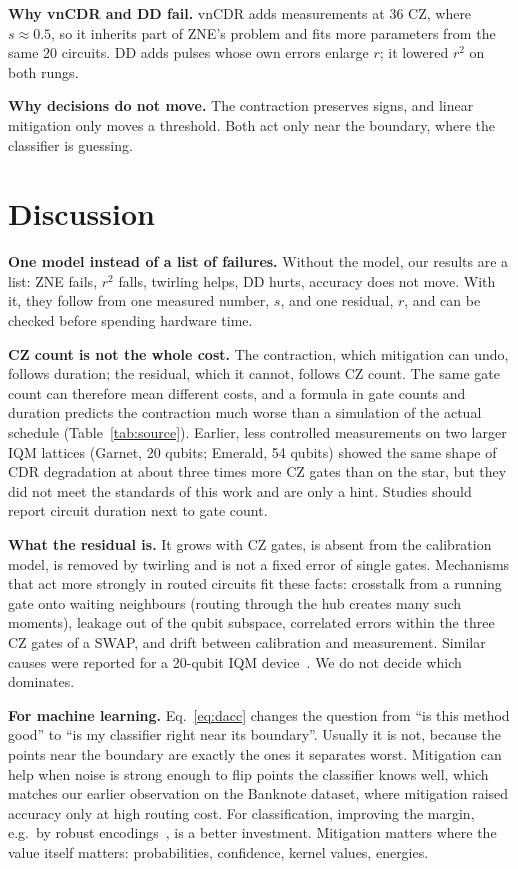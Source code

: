 \documentclass[aps,pra,twocolumn,superscriptaddress,nofootinbib,10pt]{revtex4-2}
\begin{document}
\textbf{Why vnCDR and DD fail.} vnCDR adds measurements at 36 CZ, where $s\approx0.5$, so it
inherits part of ZNE's problem and fits more parameters from the same 20 circuits. DD adds
pulses whose own errors enlarge $r$; it lowered $r^2$ on both rungs.

\textbf{Why decisions do not move.} The contraction preserves signs, and linear mitigation only
moves a threshold. Both act only near the boundary, where the classifier is guessing.

\section{Discussion}

\textbf{One model instead of a list of failures.} Without the model, our results are a list:
ZNE fails, $r^2$ falls, twirling helps, DD hurts, accuracy does not move. With it, they follow from
one measured number, $s$, and one residual, $r$, and can be checked before spending hardware time.

\textbf{CZ count is not the whole cost.} The contraction, which mitigation can undo, follows
duration; the residual, which it cannot, follows CZ count. The same gate count can therefore mean
different costs, and a formula in gate counts and duration predicts the contraction much worse than a
simulation of the actual schedule (Table~\ref{tab:source}). Earlier, less controlled measurements on two larger IQM lattices (Garnet, 20
qubits; Emerald, 54 qubits) showed the same shape of CDR degradation at about three times more CZ
gates than on the star, but they did not meet the standards of this work and are only a hint.
Studies should report circuit duration next to gate count.

\textbf{What the residual is.} It grows with CZ gates, is absent from the calibration model, is
removed by twirling and is not a fixed error of single gates. Mechanisms that act more strongly in
routed circuits fit these facts: crosstalk from a running gate onto waiting neighbours (routing
through the hub creates many such moments), leakage out of the qubit subspace, correlated errors
within the three CZ gates of a SWAP, and drift between calibration and measurement. Similar causes
were reported for a 20-qubit IQM device~\cite{iqm20bench}. We do not decide which dominates.

\textbf{For machine learning.} Eq.~\eqref{eq:dacc} changes the question from ``is this method
good'' to ``is my classifier right near its boundary''. Usually it is not, because the points near
the boundary are exactly the ones it separates worst. Mitigation can help when noise is strong
enough to flip points the classifier knows well, which matches our earlier observation on the
Banknote dataset, where mitigation raised accuracy only at high routing cost. For classification,
improving the margin, e.g.\ by robust encodings~\cite{larose2020}, is a better investment.
Mitigation matters where the value itself matters: probabilities, confidence, kernel values,
energies.
\end{document}
